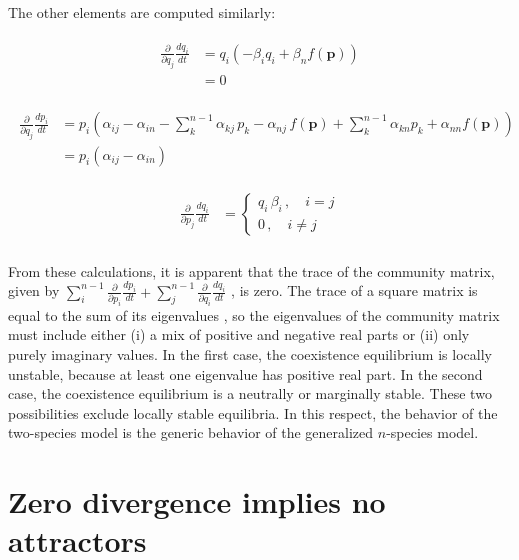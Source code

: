 \documentclass[11pt]{article}
\begin{document}
The other elements are computed similarly:

\begin{align}
\begin{split} 
\frac{\partial}{\partial q_j} \frac{dq_i}{dt} &= q_i \left( - \beta_i q_i + \beta_n f(\bm{p}) \right) \\
&= 0
\end{split}
\end{align}

\begin{align}
\begin{split} 
\frac{\partial}{\partial q_j} \frac{dp_i}{dt} &= p_i \left(\alpha_{ij} - \alpha_{in} - \sum_{k}^{n-1} \alpha_{kj} \, p_k - \alpha_{nj} \, f(\bm{p}) + \sum_{k}^{n-1} \alpha_{kn} p_k + \alpha_{nn} f(\bm{p}) \right) \\
&= p_i(\alpha_{ij} - \alpha_{in})
\end{split}
\end{align}

\begin{align} \label{lastblock}
\begin{split} 
\frac{\partial}{\partial p_j} \frac{dq_i}{dt} &= 
\begin{cases}
q_i \, \beta_{i} \, , \quad i = j\\
0 \, , \quad i \neq j
\end{cases} \\
\end{split}
\end{align}

From these calculations, it is apparent that the trace of the community matrix, given by $\sum_i^{n-1} \frac{\partial}{\partial p_i} \frac{dp_i}{dt} + \sum_j^{n-1} \frac{\partial}{\partial q_i} \frac{dq_i}{dt}$ , is zero. The trace of a square matrix is equal to the sum of its eigenvalues \citep{horn2012matrix}, so the eigenvalues of the community matrix must include either (i) a mix of positive and negative real parts or (ii) only purely imaginary values. In the first case, the coexistence equilibrium is locally unstable, because at least one eigenvalue has positive real part. In the second case, the coexistence equilibrium is a neutrally or marginally stable. These two possibilities exclude locally stable equilibria. In this respect, the behavior of the two-species model is the generic behavior of the generalized $n$-species model.

\section{Zero divergence implies no attractors}
\end{document}
